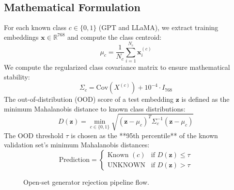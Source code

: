 \subsection{Mathematical Formulation}
For each known class $c \in \{0, 1\}$ (GPT and LLaMA), we extract training embeddings $\mathbf{x} \in \mathbb{R}^{768}$ and compute the class centroid:
$$\mu_c = \frac{1}{N_c} \sum_{i=1}^{N_c} \mathbf{x}_i^{(c)}$$
We compute the regularized class covariance matrix to ensure mathematical stability:
$$\Sigma_c = \text{Cov}(X^{(c)}) + 10^{-4} \cdot I_{768}$$
The out-of-distribution (OOD) score of a test embedding $\mathbf{z}$ is defined as the minimum Mahalanobis distance \cite{mahalanobis1936generalized} to known class distributions:
$$D(\mathbf{z}) = \min_{c \in \{0, 1\}} \sqrt{(\mathbf{z} - \mu_c)^T \Sigma_c^{-1} (\mathbf{z} - \mu_c)}$$
The OOD threshold $\tau$ is chosen as the **95th percentile** of the known validation set's minimum Mahalanobis distances:
$$\text{Prediction} = \begin{cases} \text{Known } (c) & \text{if } D(\mathbf{z}) \le \tau \\ \text{UNKNOWN} & \text{if } D(\mathbf{z}) > \tau \end{cases}$$

\begin{figure}[H]
\centering
{}
\caption{Open-set generator rejection pipeline flow.}
\label{fig:pipeline_flow}
\end{figure}

